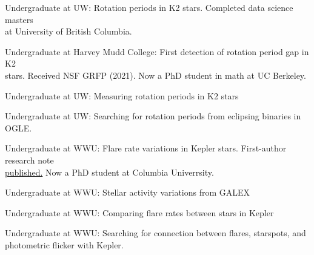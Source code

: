 Undergraduate at UW: Rotation periods in K2 stars. Completed data science masters\\ at University of British Columbia.

Undergraduate at Harvey Mudd College: First detection of rotation period gap in K2 \\stars.
Received NSF GRFP (2021). Now a PhD student in math at UC Berkeley.

Undergraduate at UW: Measuring rotation periods in K2 stars

Undergraduate at UW: Searching for rotation periods from eclipsing binaries in OGLE.

Undergraduate at WWU: Flare rate variations in Kepler stars. First-author research note \\\href{https://ui.adsabs.harvard.edu/abs/2019RNAAS...3..137S/abstract}{\color{NavyBlue} published.}
Now a PhD student at Columbia Univerrsity.

Undergraduate at WWU: Stellar activity variations from GALEX

Undergraduate at WWU: Comparing flare rates between stars in Kepler


Undergraduate at WWU: Searching for connection between flares, starspots, and\\ photometric flicker with Kepler.


